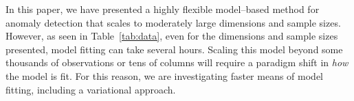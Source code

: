 In this paper, we have presented a highly flexible model--based method for
    anomaly detection that scales to moderately large dimensions and sample
    sizes.  However, as seen in Table~\ref{tab:data}, even for the dimensions
    and sample sizes presented, model fitting can take several hours.  Scaling
    this model beyond some thousands of observations or tens of columns
    will require a paradigm shift in \emph{how} the model is fit.  For this 
    reason, we are investigating faster means of model fitting, including
    a variational approach.

